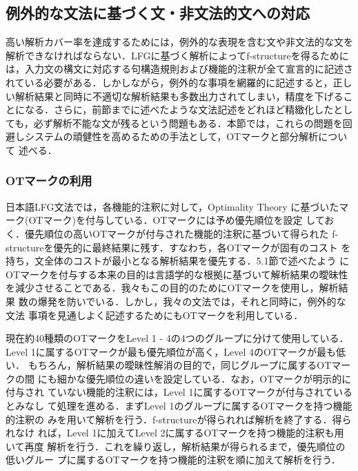 \subsection{例外的な文法に基づく文・非文法的文への対応}
高い解析カバー率を達成するためには，例外的な表現を含む文や非文法的な文を
解析できなければならない．LFGに基づく解析によってf-structureを得るために
は，入力文の構文に対応する句構造規則および機能的注釈が全て宣言的に記述さ
れている必要がある．しかしながら，例外的な事項を網羅的に記述すると，正し
い解析結果と同時に不適切な解析結果も多数出力されてしまい，精度を下げるこ
とになる．さらに，前節までに述べたような文法記述をどれほど精緻化したとし
ても，必ず解析不能な文が残るという問題もある．本節では，これらの問題を回
避しシステムの頑健性を高めるための手法として，OTマークと部分解析について
述べる．

\subsubsection{OTマークの利用}
日本語LFG文法では，各機能的注釈に対して，Optimality Theory \cite{B2001}
に基づいたマーク(OTマーク)を付与している．OTマークには予め優先順位を設定
しておく．優先順位の高いOTマークが付与された機能的注釈に基づいて得られた
f-structureを優先的に最終結果に残す．すなわち，各OTマークが固有のコスト
を持ち，文全体のコストが最小となる解析結果を優先する．5.1節で述べたよう
にOTマークを付与する本来の目的は言語学的な根拠に基づいて解析結果の曖昧性
を減少させることである．我々もこの目的のためにOTマークを使用し，解析結果
数の爆発を防いでいる．しかし，我々の文法では，それと同時に，例外的な文法
事項を見通しよく記述するためにもOTマークを利用している．

現在約40種類のOTマークをLevel 1 - 4の4つのグループに分けて使用している．
Level 1に属するOTマークが最も優先順位が高く，Level 4のOTマークが最も低い．
もちろん，解析結果の曖昧性解消の目的で，同じグループに属するOTマークの間
にも細かな優先順位の違いを設定している．なお，OTマークが明示的に付与され
ていない機能的注釈には，Level 1に属するOTマークが付与されているとみなし
て処理を進める．まずLevel 1のグループに属するOTマークを持つ機能的注釈の
みを用いて解析を行う．f-structureが得られれば解析を終了する．得られなけ
れば，Level 1に加えてLevel 2に属するOTマークを持つ機能的注釈も用いて再度
解析を行う．これを繰り返し，解析結果が得られるまで，優先順位の低いグルー
プに属するOTマークを持つ機能的注釈を順に加えて解析を行う．

